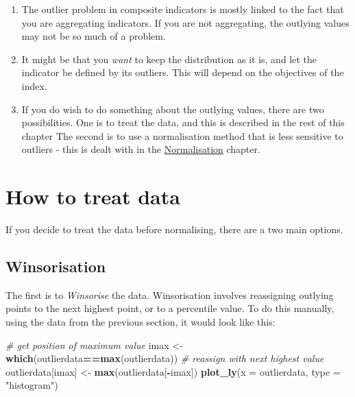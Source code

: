 \documentclass[
]{book}
\newenvironment{Shaded}{\begin{snugshade}}{\end{snugshade}}
\newcommand{\CommentTok}[1]{\textcolor[rgb]{0.56,0.35,0.01}{\textit{#1}}}
\newcommand{\DataTypeTok}[1]{\textcolor[rgb]{0.13,0.29,0.53}{#1}}
\newcommand{\KeywordTok}[1]{\textcolor[rgb]{0.13,0.29,0.53}{\textbf{#1}}}
\newcommand{\NormalTok}[1]{#1}
\newcommand{\OperatorTok}[1]{\textcolor[rgb]{0.81,0.36,0.00}{\textbf{#1}}}
\newcommand{\StringTok}[1]{\textcolor[rgb]{0.31,0.60,0.02}{#1}}
\providecommand{\tightlist}{%
  \setlength{\itemsep}{0pt}\setlength{\parskip}{0pt}}
\begin{document}
\begin{enumerate}
\def\labelenumi{\arabic{enumi}.}
\tightlist
\item
  The outlier problem in composite indicators is mostly linked to the fact that you are aggregating indicators. If you are not aggregating, the outlying values may not be so much of a problem.
\item
  It might be that you \emph{want} to keep the distribution as it is, and let the indicator be defined by its outliers. This will depend on the objectives of the index.
\item
  If you do wish to do something about the outlying values, there are two possibilities. One is to treat the data, and this is described in the rest of this chapter The second is to use a normalisation method that is less sensitive to outliers - this is dealt with in the \protect\hyperlink{normalisation}{Normalisation} chapter.
\end{enumerate}

\hypertarget{how-to-treat-data}{%
\section{How to treat data}\label{how-to-treat-data}}

If you decide to treat the data before normalising, there are a two main options.

\hypertarget{winsorisation}{%
\subsection{Winsorisation}\label{winsorisation}}

The first is to \emph{Winsorise} the data. Winsorisation involves reassigning outlying points to the next highest point, or to a percentile value. To do this manually, using the data from the previous section, it would look like this:

\begin{Shaded}
\begin{Highlighting}[]
\CommentTok{# get position of maximum value}
\NormalTok{imax <-}\StringTok{ }\KeywordTok{which}\NormalTok{(outlierdata}\OperatorTok{==}\KeywordTok{max}\NormalTok{(outlierdata))}
\CommentTok{# reassign with next highest value}
\NormalTok{outlierdata[imax] <-}\StringTok{ }\KeywordTok{max}\NormalTok{(outlierdata[}\OperatorTok{-}\NormalTok{imax])}
\KeywordTok{plot_ly}\NormalTok{(}\DataTypeTok{x =}\NormalTok{ outlierdata, }\DataTypeTok{type =} \StringTok{"histogram"}\NormalTok{)}
\end{Highlighting}
\end{Shaded}
\end{document}
